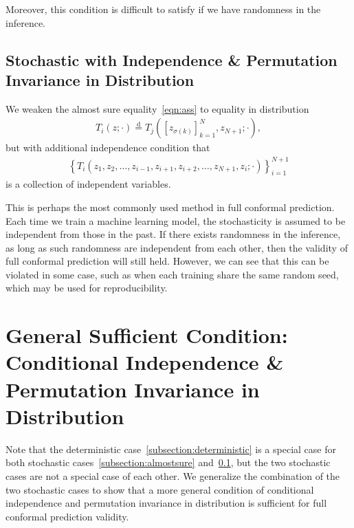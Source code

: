 \documentclass{article}
\newcommand{\oo}[1]{\left( #1 \right)}
\newcommand{\cc}[1]{\left[ #1 \right]}
\begin{document}
    Moreover, this condition is difficult to satisfy if we have randomness in the inference.
    
    
 
    \subsection{Stochastic with Independence \& Permutation Invariance in Distribution}
    \label{subsection:conditionalindependence}

    We weaken the almost sure equality~\ref{eqn:ass} to equality in distribution
    \begin{align}
    \label{eqn:indsym}
        T_i\oo{z; \cdot}
        \overset{\text{d}}{=}
        T_j\oo{\cc{z_{\sigma(k)}}_{k=1}^N, z_{N+1}; \cdot},
    \end{align}
    but with additional independence condition that
    \begin{align*}
        \left\{T_i\oo{z_1, z_2, \dots, z_{i-1}, z_{i+1}, z_{i+2}, \dots, z_{N+1}, z_i;\cdot}\right\}_{i=1}^{N+1}
    \end{align*}
    is a collection of independent variables. 
    

    This is perhaps the most commonly used method in full conformal prediction. Each time we train a machine learning model, the stochasticity is assumed to be independent from those in the past. If there exists randomness in the inference, as long as such randomness are independent from each other, then the validity of full conformal prediction will still held. However, we can see that this can be violated in some case, such as when each training share the same random seed, which may be used for reproducibility.  

\section{General Sufficient Condition: Conditional Independence \& Permutation Invariance in Distribution}

    Note that the deterministic case~\ref{subsection:deterministic} is a special case for both stochastic cases~\ref{subsection:almostsure} and~\ref{subsection:conditionalindependence}, but the two stochastic cases are not a special case of each other. We generalize the combination of the two stochastic cases to show that a more general condition of conditional independence and permutation invariance in distribution is sufficient for full conformal prediction validity.
\end{document}
